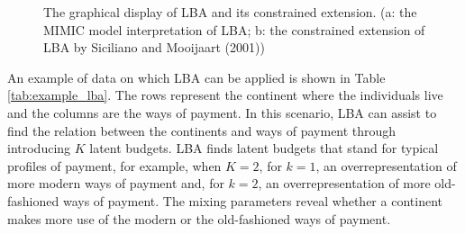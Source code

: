 \documentclass[]{interact}
\theoremstyle{plain}%
\theoremstyle{definition}
\theoremstyle{remark}
\begin{document}
\begin{figure}[H]
\caption{The graphical display of LBA and its constrained extension. (a: the MIMIC model interpretation of LBA; b: the constrained extension of LBA by Siciliano and Mooijaart (2001))}
\end{figure}

An example of data on which LBA can be applied is shown in Table
\ref{tab:example_lba}. The rows represent the continent where the
individuals live and the columns are the ways of payment. In this
scenario, LBA can assist to find the relation between the continents and
ways of payment through introducing \(K\) latent budgets. LBA finds
latent budgets that stand for typical profiles of payment, for example,
when \(K = 2\), for \(k = 1\), an overrepresentation of more modern ways
of payment and, for \(k = 2\), an overrepresentation of more
old-fashioned ways of payment. The mixing parameters reveal whether a
continent makes more use of the modern or the old-fashioned ways of
payment.
\end{document}
